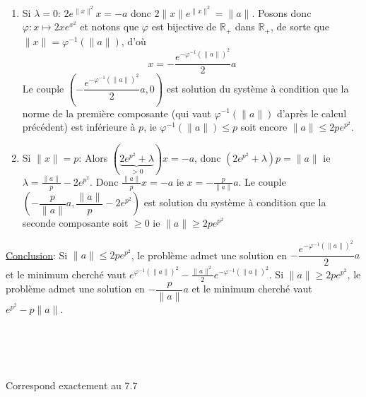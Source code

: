 \documentclass{report}
\begin{document}
\begin{enumerate}
\item Si $\lambda=0$: \newline
$2e^{\|x\|^2}x = -a $ donc $2\|x\|e^{\|x\|^2}=\|a\|$. Posons donc $\varphi:x\mapsto 2xe^{x^2}$ et notons que $\varphi$ est bijective de $\mathbb R_+$ dans $\mathbb R_+$, de sorte que $\|x\|=\varphi^{-1}(\|a\|)$, d'où $$x=-\frac{e^{-\varphi^{-1}(\|a\|)^2}}{2}a$$
Le couple $(-\dfrac{e^{-\varphi^{-1}(\|a\|)^2}}{2}a,0)$ est solution du système à condition que la norme de la première composante (qui vaut $\varphi^{-1}(\|a\|)$ d'après le calcul précédent) est inférieure à $p$, ie $\varphi^{-1}(\|a\|) \leq p$ soit encore $\|a\| \leq 2pe^{p^2}$.
\item Si $\|x\|=p$: \newline
Alors $(\underbrace{2e^{p^2}+\lambda}_{>0})x=-a$, donc $(2e^{p^2}+\lambda)p = \|a\|$ ie $\lambda = \frac{\|a\|}p-2e^{p^2}$. \newline
Donc $\frac{\|a\|}{p}x=-a$ ie $x=-\frac{p}{\|a\|}a$. Le couple $(-\dfrac{p}{\|a\|}a,\dfrac{\|a\|}p-2e^{p^2})$ est solution du système à condition que la seconde composante soit $\geq 0$ ie $\|a\| \geq 2pe^{p^2}$
\end{enumerate}
\underline{Conclusion}: Si $\|a\| \leq 2pe^{p^2}$, le problème admet une solution en $-\dfrac{e^{-\varphi^{-1}(\|a\|)^2}}{2}a$ et le minimum cherché vaut $e^{\varphi^{-1}(\|a\|)^2}-\frac{\|a\|^2}{2}e^{-\varphi^{-1}(\|a\|)^2}$. \newline
Si $\|a\| \geq 2pe^{p^2}$, le problème admet une solution en $-\dfrac{p}{\|a\|}a$ et le minimum cherché vaut $e^{p^2}-p\|a\|$.


\subsection{} \noindent\fbox{
\parbox{\linewidth}{

}}\\ 
\\ 
\\
\noindent Correspond exactement au 7.7



\newpage 
\subsection{} \noindent{}
\\
\\
\end{document}
